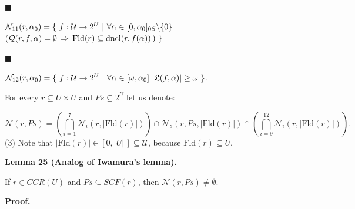  
 
\par\noindent  $\blacksquare$ 
 
$\mathcal{N}_{11}(r,\alpha_{0})=\{\leavevmode\nobreak\ f:\mathcal{U}\to 2^{U}%
\leavevmode\nobreak\ |\leavevmode\nobreak\ \forall\alpha\in[0,\alpha_{0}]_{0S}%
\backslash\{0\}$  $(\mathcal{Q}(r,f,\alpha)=\emptyset\,\Rightarrow\,\mathrm{Fld}(r)\subseteq%
\mathrm{dncl}(r,f(\alpha))\,)\leavevmode\nobreak\ \}$\par
 
 
 
\par\noindent  $\blacksquare$ 
 
$\mathcal{N}_{12}(r,\alpha_{0})=\{\leavevmode\nobreak\ f:\mathcal{U}\to 2^{U}%
\leavevmode\nobreak\ |\leavevmode\nobreak\ \forall\alpha\in[\omega,\alpha_{0}]%
\leavevmode\nobreak\ |\mathfrak{L}(f,\alpha)|\geq\omega\leavevmode\nobreak\ \}$.\par
 
 
  
 
 
For every $r\subseteq U\times U$ and $Ps\subseteq 2^{U}$ let us denote:\par
    \[\mathcal{N}(r,Ps)=\left(\bigcap_{i=1}^{7}\mathcal{N}_{i}(r,|\mathrm{Fld}(r)|)%
\right)\cap\mathcal{N}_{8}(r,Ps,|\mathrm{Fld}(r)|)\cap\left(\bigcap_{i=9}^{12}%
\mathcal{N}_{i}(r,|\mathrm{Fld}(r)|)\right).\]  (3)   
Note that $|\mathrm{Fld}(r)|\in[0,|U|\,]\subseteq\mathcal{U}$, because $\mathrm{Fld}(r)\subseteq U$.\par
 
 
 
\par\medskip\noindent\textbf{Lemma 25 (Analog of Iwamura’s lemma).}\par
 
 
If $r\in CCR(U)$ and $Ps\subseteq SCF(r)$, then $\mathcal{N}(r,Ps)\neq\emptyset$.\par
 
 
 
 
\par\medskip\noindent\textbf{Proof.}\par
 

